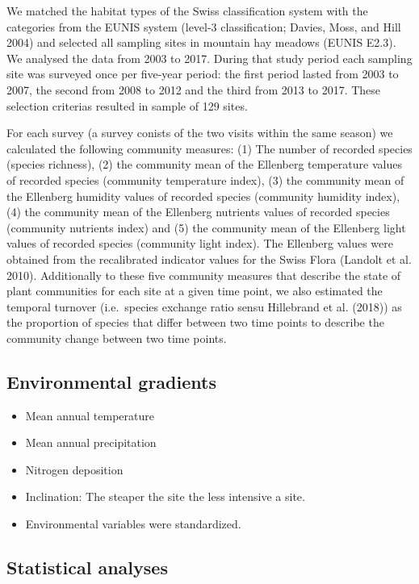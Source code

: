 \documentclass[fleqn,10pt,lineno]{wlpeerj} %
\providecommand{\tightlist}{
\setlength{\itemsep}{0pt}\setlength{\parskip}{0pt}}
\theoremstyle{definition}
\theoremstyle{definition}
\theoremstyle{definition}
\theoremstyle{remark}
\begin{document}
We matched the habitat types of the Swiss classification system with the
categories from the EUNIS system (level-3 classification; Davies, Moss,
and Hill 2004) and selected all sampling sites in mountain hay meadows
(EUNIS E2.3). We analysed the data from 2003 to 2017. During that study
period each sampling site was surveyed once per five-year period: the
first period lasted from 2003 to 2007, the second from 2008 to 2012 and
the third from 2013 to 2017. These selection criterias resulted in
sample of 129 sites.

For each survey (a survey conists of the two visits within the same
season) we calculated the following community measures: (1) The number
of recorded species (species richness), (2) the community mean of the
Ellenberg temperature values of recorded species (community temperature
index), (3) the community mean of the Ellenberg humidity values of
recorded species (community humidity index), (4) the community mean of
the Ellenberg nutrients values of recorded species (community nutrients
index) and (5) the community mean of the Ellenberg light values of
recorded species (community light index). The Ellenberg values were
obtained from the recalibrated indicator values for the Swiss Flora
(Landolt et al. 2010). Additionally to these five community measures
that describe the state of plant communities for each site at a given
time point, we also estimated the temporal turnover (i.e.~species
exchange ratio sensu Hillebrand et al. (2018)) as the proportion of
species that differ between two time points to describe the community
change between two time points.

\subsection*{Environmental gradients}\label{environmental-gradients}

\begin{itemize}
\tightlist
\item
  Mean annual temperature
\item
  Mean annual precipitation
\item
  Nitrogen deposition
\item
  Inclination: The steaper the site the less intensive a site.
\item
  Environmental variables were standardized.
\end{itemize}

\subsection*{Statistical analyses}\label{statistical-analyses}
\end{document}
